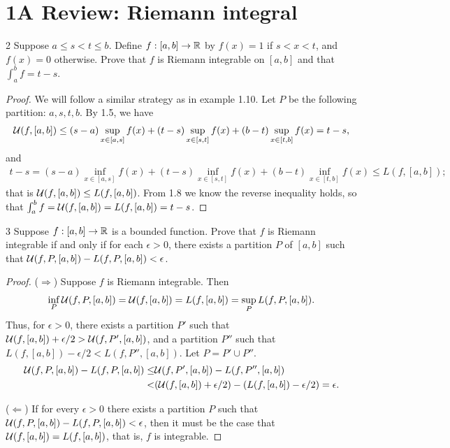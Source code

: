 \section{1A Review: Riemann integral}


\begin{exercise}{2}
Suppose $a \leq s < t \leq b$.
Define $f:[a,b]\to\mathbb{R}$ by $f(x)=1$ if $s<x<t$, and $f(x)=0$ otherwise.
Prove that $f$ is Riemann integrable on $[a,b]$ and that $\int_a^b f = t-s$.
\end{exercise}
\begin{proof}
We will follow a similar strategy as in example 1.10.
Let $P$ be the following partition: $a,s,t,b$.
By 1.5, we have
\begin{align*}
    \mathcal{U}(f,[a,b])
    \leq (s-a)\sup_{x\in[a,s]} f(x) 
    + (t-s)\sup_{x\in[s,t]} f(x) 
    + (b-t)\sup_{x\in[t,b]} f(x)
    = t-s,
\end{align*}
and
\begin{align*}
    t-s
    =(s-a)\inf_{x\in[a,s]} f(x) 
    + (t-s)\inf_{x\in[s,t]} f(x) 
    + (b-t)\inf_{x\in[t,b]} f(x)
    \leq L(f,[a,b]);
\end{align*}
that is $\mathcal{U}(f,[a,b]) \leq L(f,[a,b])$.
From 1.8 we know the reverse inequality holds, so that $\int_a^b f = \mathcal{U}(f,[a,b]) = L(f,[a,b]) = t-s$.
\end{proof} 

\begin{exercise}{3}
Suppose $f:[a,b]\to\mathbb{R}$ is a bounded function. 
Prove that $f$ is Riemann integrable if and only if for each $\epsilon>0$, there exists a partition $P$ of $[a,b]$ such that $\mathcal{U}(f,P,[a,b]) - L(f,P,[a,b]) < \epsilon$.
\end{exercise}
\begin{proof}
($\Rightarrow$)
Suppose $f$ is Riemann integrable.
Then 
\begin{align*}
    \inf_P \mathcal{U}(f,P,[a,b]) = \mathcal{U}(f,[a,b]) = L(f,[a,b]) = \sup_P L(f,P,[a,b]).
\end{align*}
Thus, for $\epsilon>0$, there exists a partition $P'$ such that $\mathcal{U}(f,[a,b]) + \epsilon/2 > \mathcal{U}(f,P',[a,b])$, and a partition $P''$ such that $L(f,[a,b]) - \epsilon/2 < L(f,P'',[a,b])$.
Let $P = P' \cup P''$.
\begin{align*}
    \mathcal{U}(f,P,[a,b]) - L(f,P,[a,b]) 
    \leq& \mathcal{U}(f,P',[a,b]) - L(f,P'',[a,b])\\
    <& (\mathcal{U}(f,[a,b]) + \epsilon/2) 
    - (L(f,[a,b]) - \epsilon/2) = \epsilon.
\end{align*}

($\Leftarrow$)
If for every $\epsilon>0$ there exists a partition $P$ such that  $\mathcal{U}(f,P,[a,b]) - L(f,P,[a,b]) < \epsilon$, then it must be the case that $\mathcal{U}(f,[a,b]) = L(f,[a,b])$, that is, $f$ is integrable.
\end{proof} 

